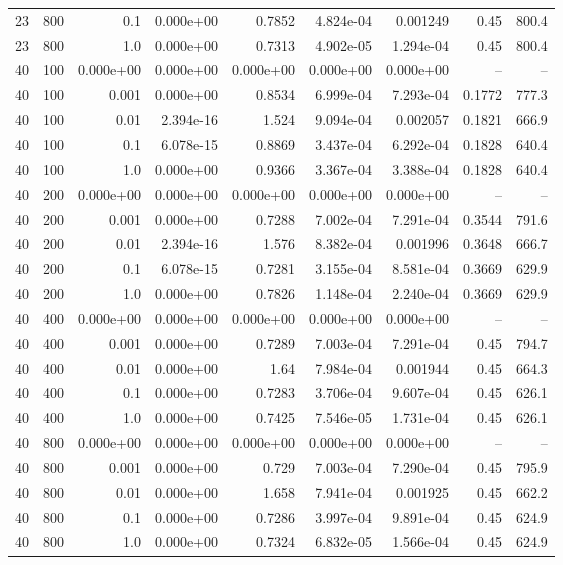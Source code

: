\begin{table}[!htb]
\begin{tabular}{@{}rrrrrrrrr@{}}
23 & 800 & 0.1 & 0.000e+00 & 0.7852 & 4.824e-04 & 0.001249 & 0.45 & 800.4 \\
23 & 800 & 1.0 & 0.000e+00 & 0.7313 & 4.902e-05 & 1.294e-04 & 0.45 & 800.4 \\
40 & 100 & 0.000e+00 & 0.000e+00 & 0.000e+00 & 0.000e+00 & 0.000e+00 & -- & -- \\
40 & 100 & 0.001 & 0.000e+00 & 0.8534 & 6.999e-04 & 7.293e-04 & 0.1772 & 777.3 \\
40 & 100 & 0.01 & 2.394e-16 & 1.524 & 9.094e-04 & 0.002057 & 0.1821 & 666.9 \\
40 & 100 & 0.1 & 6.078e-15 & 0.8869 & 3.437e-04 & 6.292e-04 & 0.1828 & 640.4 \\
40 & 100 & 1.0 & 0.000e+00 & 0.9366 & 3.367e-04 & 3.388e-04 & 0.1828 & 640.4 \\
40 & 200 & 0.000e+00 & 0.000e+00 & 0.000e+00 & 0.000e+00 & 0.000e+00 & -- & -- \\
40 & 200 & 0.001 & 0.000e+00 & 0.7288 & 7.002e-04 & 7.291e-04 & 0.3544 & 791.6 \\
40 & 200 & 0.01 & 2.394e-16 & 1.576 & 8.382e-04 & 0.001996 & 0.3648 & 666.7 \\
40 & 200 & 0.1 & 6.078e-15 & 0.7281 & 3.155e-04 & 8.581e-04 & 0.3669 & 629.9 \\
40 & 200 & 1.0 & 0.000e+00 & 0.7826 & 1.148e-04 & 2.240e-04 & 0.3669 & 629.9 \\
40 & 400 & 0.000e+00 & 0.000e+00 & 0.000e+00 & 0.000e+00 & 0.000e+00 & -- & -- \\
40 & 400 & 0.001 & 0.000e+00 & 0.7289 & 7.003e-04 & 7.291e-04 & 0.45 & 794.7 \\
40 & 400 & 0.01 & 0.000e+00 & 1.64 & 7.984e-04 & 0.001944 & 0.45 & 664.3 \\
40 & 400 & 0.1 & 0.000e+00 & 0.7283 & 3.706e-04 & 9.607e-04 & 0.45 & 626.1 \\
40 & 400 & 1.0 & 0.000e+00 & 0.7425 & 7.546e-05 & 1.731e-04 & 0.45 & 626.1 \\
40 & 800 & 0.000e+00 & 0.000e+00 & 0.000e+00 & 0.000e+00 & 0.000e+00 & -- & -- \\
40 & 800 & 0.001 & 0.000e+00 & 0.729 & 7.003e-04 & 7.290e-04 & 0.45 & 795.9 \\
40 & 800 & 0.01 & 0.000e+00 & 1.658 & 7.941e-04 & 0.001925 & 0.45 & 662.2 \\
40 & 800 & 0.1 & 0.000e+00 & 0.7286 & 3.997e-04 & 9.891e-04 & 0.45 & 624.9 \\
40 & 800 & 1.0 & 0.000e+00 & 0.7324 & 6.832e-05 & 1.566e-04 & 0.45 & 624.9 \\
        \bottomrule
    \end{tabular}
\end{table}
